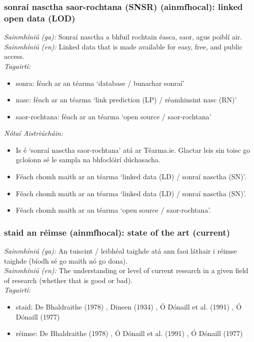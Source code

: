 \documentclass{article}
\begin{document}
\subsubsection*{sonraí nasctha saor-rochtana (SNSR) (ainmfhocal): linked open data (LOD)}
 \noindent \textit{Sainmhíniú (ga):} Sonraí nasctha a bhfuil rochtain éasca, saor, agus poiblí air.
\\
 \noindent \textit{Sainmhíniú (en):} Linked data that is made available for easy, free, and public access.
\\
 \noindent \textit{Tagairtí:}
\begin{itemize}
	\item sonra: féach ar an téarma `database / bunachar sonraí'
	\item nasc: féach ar an téarma `link prediction (LP) / réamhinsint nasc (RN)'
	\item saor-rochtana: féach ar an téarma `open source / saor-rochtana'
\end{itemize}

 \noindent \textit{Nótaí Aistriúcháin:}
\begin{itemize}
	\item Is é `sonraí nasctha saor-rochtana' atá ar Téarma.ie. Glactar leis sin toisc go gcloíonn sé le sampla na bhfoclóirí dúchasacha.
	\item Féach chomh maith ar an téarma `linked data (LD) / sonraí nasctha (SN)'.
	\item Féach chomh maith ar an téarma `linked data (LD) / sonraí nasctha (SN)'.
	\item Féach chomh maith ar an téarma `open source / saor-rochtana'.
\end{itemize}


\subsubsection*{staid an réimse (ainmfhocal): state of the art (current)}
 \noindent \textit{Sainmhíniú (ga):} An tuiscint / leibhéal taighde atá ann faoi láthair i réimse taighde (bíodh sé go maith nó go dona).
\\
 \noindent \textit{Sainmhíniú (en):} The understanding or level of current research in a given field of research (whether that is good or bad).
\\
 \noindent \textit{Tagairtí:}
\begin{itemize}
	\item staid: De Bhaldraithe (1978) \cite{de-bhaldraithe}, Dineen (1934) \cite{dineen}, Ó Dónaill et al. (1991) \cite{focloir-beag}, Ó Dónaill (1977) \cite{odonaill}
	\item réimse: De Bhaldraithe (1978) \cite{de-bhaldraithe}, Ó Dónaill et al. (1991) \cite{focloir-beag}, Ó Dónaill (1977) \cite{odonaill}
\end{itemize}
\end{document}
